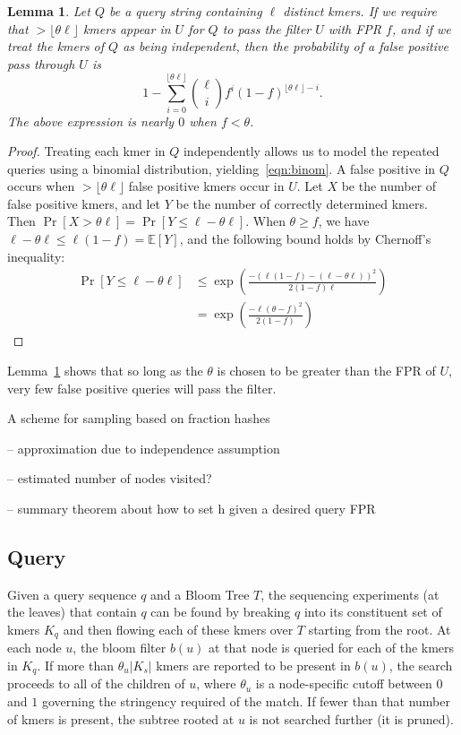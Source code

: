 \documentclass[11pt]{article}
\newtheorem{lem}{Lemma}
\newcommand\EE{\mathbb{E}}
\begin{document}
\begin{lem}\label{lem:query}
Let $Q$ be a query string containing $\ell$ distinct kmers. If we require that $>\lfloor\theta\ell\rfloor$ kmers appear in $U$ for $Q$ to pass the filter $U$ with FPR $f$, and if we treat the kmers of $Q$ as being independent, then the probability of a false positive pass through $U$ is
\begin{equation}\label{eqn:binom}
1 - \sum_{i=0}^{\lfloor \theta\ell\rfloor} \binom{\ell}{i}f^i(1-f)^{\lfloor\theta\ell\rfloor - i}. 
\end{equation}
The above expression is nearly $0$ when $f < \theta$.  
\end{lem}
\begin{proof}
Treating each kmer in $Q$ independently allows us to model the repeated queries using a binomial distribution, yielding~\eqref{eqn:binom}. A false positive in $Q$ occurs when $> \lfloor \theta \ell \rfloor$ false positive kmers occur in $U$. Let $X$ be the number of false positive kmers, and let $Y$ be the number of correctly determined kmers. Then
$\Pr[X > \theta\ell] = \Pr[Y \leq \ell - \theta\ell]$.
When $\theta \geq f$, we have $\ell - \theta\ell \leq \ell (1-f) = \EE[Y]$, and the following bound holds by Chernoff's inequality:
\begin{align}
\Pr[Y \leq \ell - \theta\ell] 
	&\leq \exp\left(\frac{-(\ell(1-f) - (\ell-\theta\ell))^2}{2(1-f)\ell}\right)\\
	&= \exp\left(\frac{-\ell(\theta - f)^2}{2(1-f)}\right)
\end{align}
\end{proof}

Lemma~\ref{lem:query} shows that so long as the $\theta$ is chosen to be greater than the FPR of $U$, very few false positive queries will pass the filter.


A scheme for sampling based on fraction hashes

-- approximation due to independence assumption

-- estimated number of nodes visited?

-- summary theorem about how to set h given a desired query FPR

\subsection{Query}

Given a query sequence $q$ and a Bloom Tree $T$, the sequencing experiments (at the leaves) that contain $q$ can be found by breaking $q$ into its constituent set of kmers $K_q$ and then flowing each of these kmers over $T$ starting from the root. At each node $u$, the bloom filter $b(u)$ at that node is queried for each of the kmers in $K_q$. If more than $\theta_u|K_s|$ kmers are reported to be present in $b(u)$, the search proceeds to all of the children of $u$, where $\theta_u$ is a node-specific cutoff between $0$ and $1$ governing the stringency required of the match. If fewer than that number of kmers is present, the subtree rooted at $u$ is not searched further (it is pruned). 
\end{document}
